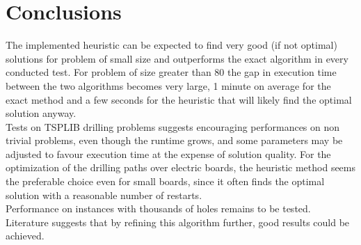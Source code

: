 \section{Conclusions}
\label{sec:conclusion}
The implemented heuristic can be expected to find very good (if not optimal) solutions for problem of small size and outperforms the exact algorithm in every conducted test. For problem of size greater than 80 the gap in execution time between the two algorithms becomes very large, 1 minute on average for the exact method and a few seconds for the heuristic that will likely find the optimal solution anyway.\\
Tests on TSPLIB drilling problems suggests encouraging performances on non trivial problems, even though the runtime grows, and some parameters may be adjusted to favour execution time at the expense of solution quality.
For the optimization of the drilling paths over electric boards, the heuristic method seems the preferable choice even for small boards, since it often finds the optimal solution with a reasonable number of restarts. \\
Performance on instances with thousands of holes remains to be tested. Literature suggests that by refining this algorithm further, good results could be achieved.
    

